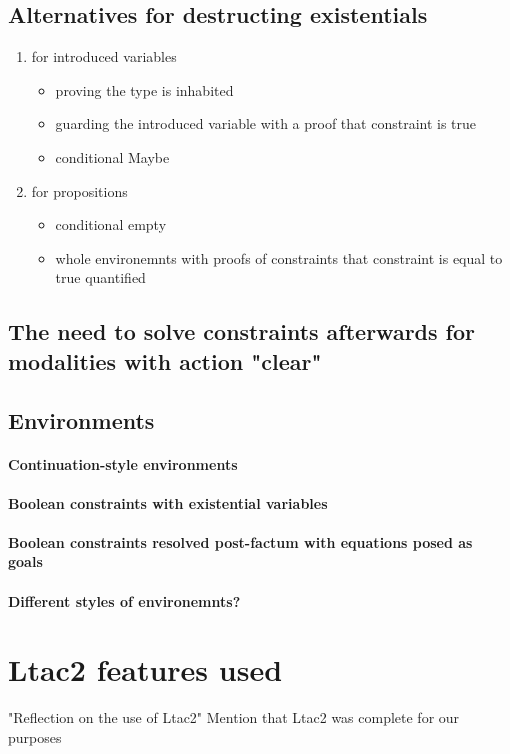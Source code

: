 \subsection{Alternatives for destructing existentials}
\label{sec:design_decisions_existential}


\begin{enumerate}
\item for introduced variables

\begin{itemize}
\item proving the type is inhabited
\item guarding the introduced variable with a proof that constraint is true
\item conditional Maybe
\end{itemize}
\item for propositions

\begin{itemize}
\item conditional empty
\item whole environemnts with proofs of constraints that constraint is equal to true quantified
\end{itemize}
\end{enumerate}

\subsection{The need to solve constraints afterwards for modalities with action "clear"}

\subsection{Environments}

\paragraph{Continuation-style environments}

\paragraph{Boolean constraints with existential variables}

\paragraph{Boolean constraints resolved post-factum with equations posed as goals}

\paragraph{Different styles of environemnts?}

\section{Ltac2 features used}

"Reflection on the use of Ltac2"
Mention that Ltac2 was complete for our purposes
